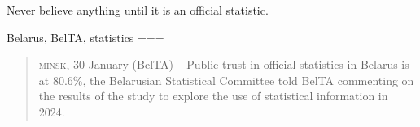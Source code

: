 Never believe anything until it is an official statistic.

Belarus, BelTA, statistics
===
\begin{quote}
\textsc{minsk}, 30 January (BelTA) – Public trust in official statistics in Belarus is at  80.6\%, the Belarusian Statistical Committee told BelTA commenting on the results of the study to explore the use of statistical information in 2024.
\end{quote}
\nocite{2025d}
